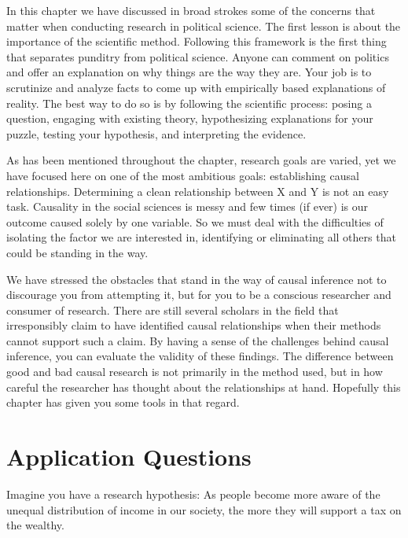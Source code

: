 \documentclass{book}
\begin{document}
In this chapter we have discussed in broad strokes some of the concerns that
matter when conducting research in political science. The first lesson is
about the importance of the scientific method. Following this framework is the
first thing that separates punditry from political science. Anyone can comment
on politics and offer an explanation on why things are the way they are. Your
job is to scrutinize and analyze facts to come up with empirically based
explanations of reality. The best way to do so is by following the scientific
process: posing a question, engaging with existing theory, hypothesizing
explanations for your puzzle, testing your hypothesis, and interpreting the
evidence.

As has been mentioned throughout the chapter, research goals are varied, yet
we have focused here on one of the most ambitious goals: establishing causal
relationships. Determining a clean relationship between X and Y is not an easy
task. Causality in the social sciences is messy and few times (if ever) is our
outcome caused solely by one variable. So we must deal with the difficulties
of isolating the factor we are interested in, identifying or eliminating all
others that could be standing in the way.

We have stressed the obstacles that stand in the way of causal inference not
to discourage you from attempting it, but for you to be a conscious researcher
and consumer of research. There are still several scholars in the field that
irresponsibly claim to have identified causal relationships when their methods
cannot support such a claim. By having a sense of the challenges behind causal
inference, you can evaluate the validity of these findings. The difference
between good and bad causal research is not primarily in the method used, but
in how careful the researcher has thought about the relationships at hand.
Hopefully this chapter has given you some tools in that regard.

\hypertarget{application-questions}{%
\section{Application Questions}\label{application-questions}}

Imagine you have a research hypothesis: As people become more aware of the
unequal distribution of income in our society, the more they will support a
tax on the wealthy.
\end{document}
